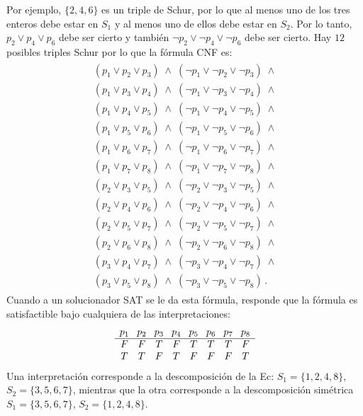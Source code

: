 Por ejemplo, $\{2,4,6\}$ es un triple de Schur, por lo que al menos uno de los tres enteros debe estar en $S_1$ y al menos uno de ellos debe estar en $S_2$. Por lo tanto, $p_2 \vee p_4 \vee p_6$ debe ser cierto y también $\neg p_2 \vee \neg p_4 \vee \neg p_6$ debe ser cierto. Hay $12$ posibles triples Schur por lo que la fórmula CNF es:
\begin{align}
\begin{array}{l}
(p_1 \vee p_2 \vee p_3) \;\wedge\; (\neg p_1 \vee \neg p_2 \vee \neg p_3) \;\wedge \\
(p_1 \vee p_3 \vee p_4) \;\wedge\; (\neg p_1 \vee \neg p_3 \vee \neg p_4) \;\wedge \\
(p_1 \vee p_4 \vee p_5) \;\wedge\; (\neg p_1 \vee \neg p_4 \vee \neg p_5) \;\wedge \\
(p_1 \vee p_5 \vee p_6) \;\wedge\; (\neg p_1 \vee \neg p_5 \vee \neg p_6) \;\wedge \\
(p_1 \vee p_6 \vee p_7) \;\wedge\; (\neg p_1 \vee \neg p_6 \vee \neg p_7) \;\wedge \\
(p_1 \vee p_7 \vee p_8) \;\wedge\; (\neg p_1 \vee \neg p_7 \vee \neg p_8) \;\wedge \\
(p_2 \vee p_3 \vee p_5) \;\wedge\; (\neg p_2 \vee \neg p_3 \vee \neg p_5) \;\wedge \\
(p_2 \vee p_4 \vee p_6) \;\wedge\; (\neg p_2 \vee \neg p_4 \vee \neg p_6) \;\wedge \\
(p_2 \vee p_5 \vee p_7) \;\wedge\; (\neg p_2 \vee \neg p_5 \vee \neg p_7) \;\wedge \\
(p_2 \vee p_6 \vee p_8) \;\wedge\; (\neg p_2 \vee \neg p_6 \vee \neg p_8) \;\wedge \\
(p_3 \vee p_4 \vee p_7) \;\wedge\; (\neg p_3 \vee \neg p_4 \vee \neg p_7) \;\wedge \\
(p_3 \vee p_5 \vee p_8) \;\wedge\; (\neg p_3 \vee \neg p_5 \vee \neg p_8)\,.
\end{array}\label{eq.schur2}
\end{align}
Cuando a un solucionador SAT se le da esta fórmula, responde que la fórmula es satisfactible bajo cualquiera de las interpretaciones:
\[
\begin{array}{c@{\hspace{8pt}}c@{\hspace{8pt}}c@{\hspace{8pt}}c@{\hspace{8pt}}c@{\hspace{8pt}}c@{\hspace{8pt}}c@{\hspace{8pt}}c}
p_1&p_2&p_3&p_4&p_5&p_6&p_7&p_8\\\hline
F&F&T&F&T&T&T&F\\
T&T&F&T&F&F&F&T
\end{array}
\]
Una interpretación corresponde a la descomposición de la Ec: $S_1=\{1,2,4,8\}$, $S_2=\{3,5,6,7\}$, mientras que la otra corresponde a la descomposición simétrica $S_1=\{3,5,6,7\}$, $S_2=\{1,2,4,8\}$.

